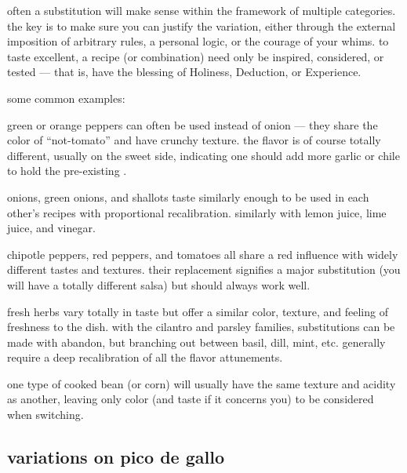 often a substitution will make sense within the framework of multiple
categories. the key is to make sure you can justify the variation,
either through the external imposition of arbitrary rules, a personal
logic, or the courage of your whims. to taste excellent, a recipe (or
combination) need only be inspired, considered, or tested --- that is,
have the blessing of Holiness, Deduction, or Experience.

some common examples:

\begin{ingredients}
  \item green or orange peppers can often be used instead of onion ---
  they share the color of ``not-tomato'' and have crunchy texture. the
  flavor is of course totally different, usually on the sweet side,
  indicating one should add more garlic or chile to hold the
  pre-existing .

  \item onions, green onions, and shallots taste similarly enough to
  be used in each other's recipes with proportional
  recalibration. similarly with lemon juice, lime juice, and vinegar.

  \item chipotle peppers, red peppers, and tomatoes all share a red
  influence with widely different tastes and textures. their
  replacement signifies a major substitution (you will have a totally
  different salsa) but should always work well.

  \item fresh herbs vary totally in taste but offer a similar color,
  texture, and feeling of freshness to the dish. with the cilantro and
  parsley families, substitutions can be made with abandon, but
  branching out between basil, dill, mint, etc. generally require a
  deep recalibration of all the flavor attunements.

  \item one type of cooked bean (or corn) will usually have the same
  texture and acidity as another, leaving only color (and taste if it
  concerns you) to be considered when switching.
\end{ingredients}

\subsection{variations on pico de gallo}

